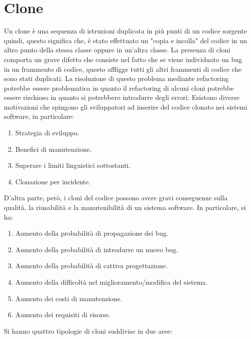 \section{Clone}
Un clone è una sequenza di istruzioni duplicata in più punti di un codice sorgente quindi, questo significa che, è stato effettuato un "copia e incolla" del codice in un altro punto della stessa classe oppure in un'altra classe. La presenza di cloni comporta un grave difetto che consiste nel fatto che se viene individuato un bug in un frammento di codice, questo affligge tutti gli altri frammenti di codice che sono stati duplicati. La risoluzione di questo problema mediante refactoring potrebbe essere problematica in quanto il refactoring di alcuni cloni potrebbe essere rischioso in quanto si potrebbero introdurre degli errori. Esistono diverse motivazioni che spingono gli sviluppatori ad inserire del codice clonato nei sistemi software, in particolare:
\begin{enumerate}
\item	Strategia di sviluppo.
\item	Benefici di manutenzione.
\item	Superare i limiti linguistici sottostanti.
\item	Clonazione per incidente.
\end{enumerate}
D'altra parte, però, i cloni del codice possono avere gravi conseguenze sulla qualità, la riusabilità e la manutenibilità di un sistema software. In particolare, si ha:
\begin{enumerate}
\item	Aumento della probabilità di propagazione dei bug.
\item	Aumento della probabilità di introdurre un nuovo bug.
\item	Aumento della probabilità di cattiva progettazione.
\item	Aumento della difficoltà nel miglioramento/modifica del sistema.
\item	Aumento dei costi di manutenzione.
\item	Aumento dei requisiti di risorse.
\end{enumerate}
Si hanno quattro tipologie di cloni suddivise in due aree:
